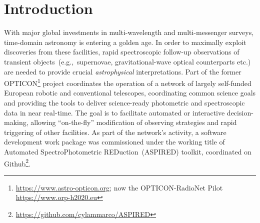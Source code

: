 \documentclass[linenumbers, twocolumn]{aastex631}
\begin{document}


\section{Introduction}
With major global investments in multi-wavelength and multi-messenger surveys,
time-domain astronomy is entering a golden age. In order to maximally exploit
discoveries from these facilities, rapid spectroscopic follow-up observations
of transient objects~(e.g.,\ supernovae, gravitational-wave optical counterparts
etc.) are needed to provide crucial {\em astrophysical} interpretations. Part of
the former OPTICON\footnote{\url{https://www.astro-opticon.org}; now the
OPTICON-RadioNet Pilot \url{https://www.orp-h2020.eu}} project coordinates the
operation of a network of largely self-funded European robotic and conventional
telescopes, coordinating common science goals and providing the tools to deliver
science-ready photometric and spectroscopic data in near real-time. The goal is
to facilitate automated or interactive decision-making, allowing ``on-the-fly''
modification of observing strategies and rapid triggering of other facilities.
As part of the network's activity, a software development work package was
commissioned under the working title of Automated SpectroPhotometric
REDuction~(\textsc{ASPIRED}) toolkit, coordinated on
Github\footnote{\url{https://github.com/cylammarco/ASPIRED}}.
\end{document}
